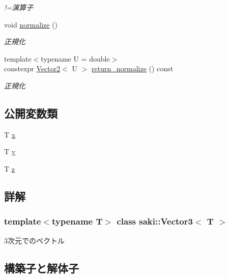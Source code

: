 \begin{DoxyCompactItemize}
\begin{DoxyCompactList}\small\item\em !=演算子 \end{DoxyCompactList}\item 
void \mbox{\hyperlink{classsaki_1_1_vector3_a7b9496274bab6ea6147e6a09e1493110}{normalize}} ()
\begin{DoxyCompactList}\small\item\em 正規化 \end{DoxyCompactList}\item 
{\footnotesize template$<$typename U  = double$>$ }\\constexpr \mbox{\hyperlink{classsaki_1_1_vector2}{Vector2}}$<$ U $>$ \mbox{\hyperlink{classsaki_1_1_vector3_ab4bbc1a8a3cbf860996a5136b3c1536f}{return\+\_\+normalize}} () const
\begin{DoxyCompactList}\small\item\em 正規化 \end{DoxyCompactList}\end{DoxyCompactItemize}
\subsection*{公開変数類}
\begin{DoxyCompactItemize}
\item 
T \mbox{\hyperlink{classsaki_1_1_vector3_a1fa58e9e75dbeb650afb3db740f3131c}{x}}
\item 
T \mbox{\hyperlink{classsaki_1_1_vector3_aba41be4543769bd023387691acf654dd}{y}}
\item 
T \mbox{\hyperlink{classsaki_1_1_vector3_abb4ddf92f66d05e965fbd17ab3e655ff}{z}}
\end{DoxyCompactItemize}


\subsection{詳解}
\subsubsection*{template$<$typename T$>$\newline
class saki\+::\+Vector3$<$ T $>$}

3次元でのベクトル 

\subsection{構築子と解体子}
\mbox{\label{classsaki_1_1_vector3_a8617fe1a8d279c9673628728a0c5e5c6}} 
